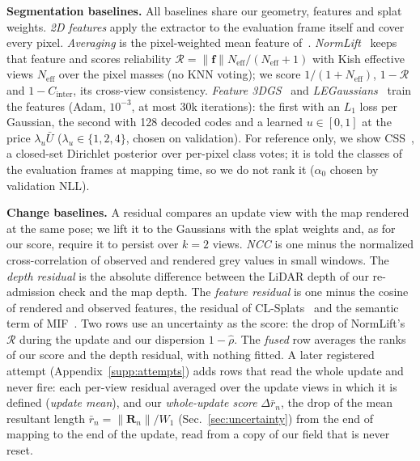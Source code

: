\documentclass[journal]{IEEEtran}
\newcommand{\R}{\mathbf{R}}
\newcommand{\secref}[1]{Sec.~\mbox{\ref{#1}}}       %
\begin{document}
\textbf{Segmentation baselines.} All baselines share our geometry, features and splat weights. \emph{2D features} apply the extractor to the evaluation frame itself and cover every pixel. \emph{Averaging} is the pixel-weighted mean feature of~\cite{joseph2025gradbp}. \emph{NormLift}~\cite{zang2026normlift} keeps that feature and scores reliability $\mathcal{R}=\lVert\mathbf{f}\rVert N_{\mathrm{eff}}/(N_{\mathrm{eff}}+1)$ with Kish effective views $N_{\mathrm{eff}}$ over the pixel masses (no KNN voting); we score $1/(1+N_{\mathrm{eff}})$, $1-\mathcal{R}$ and $1-C_{\mathrm{inter}}$, its cross-view consistency. \emph{Feature 3DGS}~\cite{zhou2024feature} and \emph{LEGaussians}~\cite{shi2024legaussians} train the features (Adam, $10^{-3}$, at most 30k iterations): the first with an $L_1$ loss per Gaussian, the second with 128 decoded codes and a learned $u\in[0,1]$ at the price $\lambda_u\bar U$ ($\lambda_u\in\{1,2,4\}$, chosen on validation). For reference only, we show CSS~\cite{wilson2025css}, a closed-set Dirichlet posterior over per-pixel class votes; it is told the classes of the evaluation frames at mapping time, so we do not rank it ($\alpha_0$ chosen by validation NLL).

\textbf{Change baselines.} A residual compares an update view with the map rendered at the same pose; we lift it to the Gaussians with the splat weights and, as for our score, require it to persist over $k=2$ views. \emph{NCC} is one minus the normalized cross-correlation of observed and rendered grey values in small windows. The \emph{depth residual} is the absolute difference between the LiDAR depth of our re-admission check and the map depth. The \emph{feature residual} is one minus the cosine of rendered and observed features, the residual of CL-Splats~\cite{ackermann2025clsplats} and the semantic term of MIF~\cite{jiang2026mif}. Two rows use an uncertainty as the score: the drop of NormLift's $\mathcal{R}$ during the update and our dispersion $1-\hat\rho$. The \emph{fused} row averages the ranks of our score and the depth residual, with nothing fitted. A later registered attempt (Appendix~\ref{supp:attempts}) adds rows that read the whole update and never fire: each per-view residual averaged over the update views in which it is defined (\emph{update mean}), and our \emph{whole-update score} $\Delta\bar r_n$, the drop of the mean resultant length $\bar r_n=\lVert\R_n\rVert/W_1$ (\secref{sec:uncertainty}) from the end of mapping to the end of the update, read from a copy of our field that is never reset.
\end{document}
